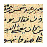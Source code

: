 \documentclass[conference,a4paper,twocolumn]{IEEEtran}
\begin{document}

\begin{figure}
\centering
\begin{minipage}{.30\linewidth}
  \includegraphics[width=\linewidth]{figures/3.png}
  \label{img1}
\end{minipage}
\hspace{.05\linewidth}
\begin{minipage}{.30\linewidth}

\end{minipage}
\end{figure}
\end{document}
